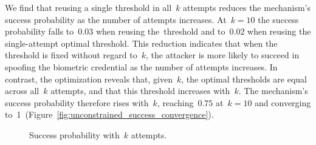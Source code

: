 \documentclass[conference,compsoc]{IEEEtran}
\begin{document}
We find that reusing a single threshold in all~$k$ attempts reduces the mechanism’s success probability as the number of attempts increases.
At~$k=10$ the success probability falls to~$0.03$ when reusing the~\EER threshold and to~$0.02$ when reusing the single-attempt optimal threshold. 
This reduction indicates that when the threshold is fixed without regard to~$k$, the attacker is more likely to succeed in spoofing the biometric credential as the number of attempts increases. 
In contrast, the optimization reveals that, given~$k$, the optimal thresholds are equal across all~$k$ attempts, and that this threshold increases with~$k$.
The mechanism’s success probability therefore rises with~$k$, reaching~$0.75$ at~$k=10$ and converging to~1~(Figure~\ref{fig:unconstrained_success_convergence}). 

\begin{figure}[t]
\centering
{}
\caption{Success probability with~$k$ attempts.}
\label{fig:Success_probability_by_k}
\end{figure}

\pgfplotsset{compat=1.18}
\end{document}
